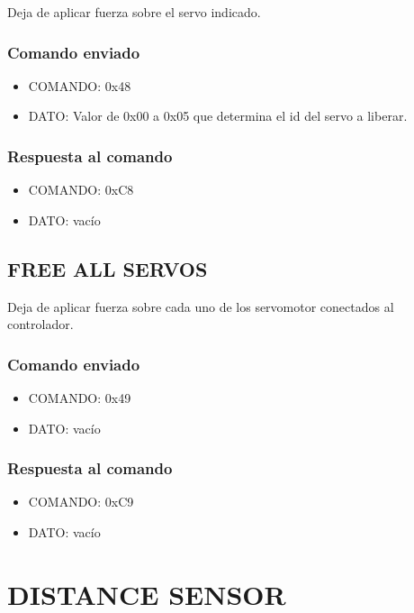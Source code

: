 \documentclass[a4paper,10pt]{article}
\begin{document}
Deja de aplicar fuerza sobre el servo indicado.

\subsubsection*{Comando enviado}

\begin{itemize}
	\item{COMANDO:} 0x48
	\item{DATO:} Valor de 0x00 a 0x05 que determina el id del servo a liberar.
\end{itemize}

\subsubsection*{Respuesta al comando}

\begin{itemize}
	\item{COMANDO:} 0xC8
	\item{DATO:} vac\'io
\end{itemize}

\subsection{FREE ALL SERVOS}
\label{free_all_servos}

Deja de aplicar fuerza sobre cada uno de los servomotor conectados al controlador.

\subsubsection*{Comando enviado}

\begin{itemize}
	\item{COMANDO:} 0x49
	\item{DATO:} vac\'io
\end{itemize}

\subsubsection*{Respuesta al comando}

\begin{itemize}
	\item{COMANDO:} 0xC9
	\item{DATO:} vac\'io
\end{itemize}

\section{DISTANCE SENSOR}
\label{grupo_distance_sensor}
\end{document}

